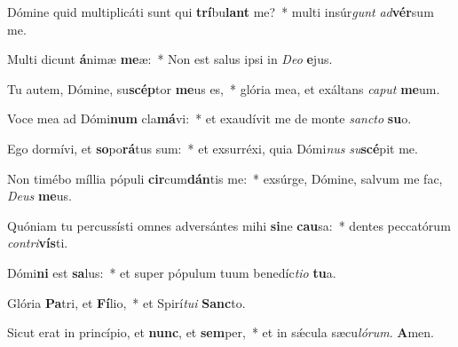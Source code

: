 \item Dómine quid multiplicáti sunt qui \textbf{trí}bu\textbf{lant} me?~* multi insúr\textit{gunt} \textit{ad}\textbf{vér}sum me.
\item Multi dicunt \textbf{á}nimæ \textbf{me}æ:~* Non est salus ipsi in \textit{De}\textit{o} \textbf{e}jus.
\item Tu autem, Dómine, su\textbf{scép}tor \textbf{me}us es,~* glória mea, et exáltans \textit{ca}\textit{put} \textbf{me}um.
\item Voce mea ad Dómi\textbf{num} cla\textbf{má}vi:~* et exaudívit me de monte \textit{sanc}\textit{to} \textbf{su}o.
\item Ego dormívi, et \textbf{so}po\textbf{rá}tus sum:~* et exsurréxi, quia Dómi\textit{nus} \textit{su}\textbf{scé}pit me.
\item Non timébo míllia pópuli \textbf{cir}cum\textbf{dán}tis me:~* exsúrge, Dómine, salvum me fac, \textit{De}\textit{us} \textbf{me}us.
\item Quóniam tu percussísti omnes adversántes mihi \textbf{si}ne \textbf{cau}sa:~* dentes peccatórum \textit{con}\textit{tri}\textbf{vís}ti.
\item Dómi\textbf{ni} est \textbf{sa}lus:~* et super pópulum tuum benedíc\textit{ti}\textit{o} \textbf{tu}a.
\item Glória \textbf{Pa}tri, et \textbf{Fí}lio,~* et Spirí\textit{tu}\textit{i} \textbf{Sanc}to.
\item Sicut erat in princípio, et \textbf{nunc}, et \textbf{sem}per,~* et in sǽcula sæcu\textit{ló}\textit{rum}. \textbf{A}men.
